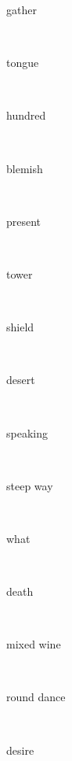 \documentclass[a4paper]{article}
\begin{document}
\begin{multicols}{4}
\begin{multicols}{4}
\begin{multicols}{5}
{\hebrewfont{}} \begin{english}gather\end{english}\\
{\hebrewfont{}} \begin{english}tongue\end{english}\\
{\hebrewfont{}} \begin{english}hundred\end{english}\\
{\hebrewfont{}} \begin{english}blemish\end{english}\\
{\hebrewfont{}} \begin{english}present\end{english}\\
{\hebrewfont{}} \begin{english}tower\end{english}\\
{\hebrewfont{}} \begin{english}shield\end{english}\\
{\hebrewfont{}} \begin{english}desert\end{english}\\
{\hebrewfont{}} \begin{english}speaking\end{english}\\
{\hebrewfont{}} \begin{english}steep way\end{english}\\
{\hebrewfont{}} \begin{english}what\end{english}\\
{\hebrewfont{}} \begin{english}death\end{english}\\
{\hebrewfont{}} \begin{english}mixed wine\end{english}\\
{\hebrewfont{}} \begin{english}round dance\end{english}\\
{\hebrewfont{}} \begin{english}desire\end{english}\\

\end{multicols}
\end{multicols}
\end{multicols}
\end{document}
